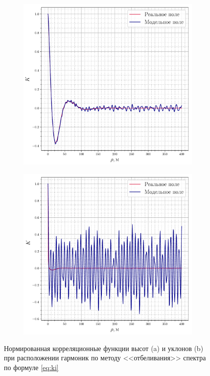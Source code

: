\begin{figure}[h!]
    \centering
    \begin{subfigure}{0.49\linewidth}
        \centering
        \includegraphics[width=\linewidth]{fig/correlation_height_height2.pdf}
        \caption{}
    \end{subfigure}
    \begin{subfigure}{0.49\linewidth}
        \centering
        \includegraphics[width=\linewidth]{fig/correlation_angles_height2.pdf}
        \caption{}
    \end{subfigure}
    \caption{ Нормированная корреляционные функции высот (a) и уклонов (b) при расположении гармоник
    по методу <<отбеливания>> спектра по формуле \eqref{eq:ki} }
    \label{fig:ki}
\end{figure}

